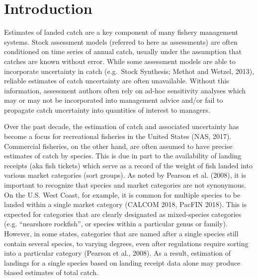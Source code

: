 \documentclass[12pt]{article}
\begin{document}
%
\clearpage
\onehalfspacing
%

%
%
\section{Introduction}\label{introduction}
%
%

Estimates of landed catch are a key component of many fishery management
systems. Stock assessment models (referred to here as assessments) are
often conditioned on time series of annual catch, usually under the
assumption that catches are known without error. While some assessment
models are able to incorporate uncertainty in catch (e.g.~Stock
Synthesis; Methot and Wetzel, 2013), reliable estimates of catch
uncertainty are often unavailable. Without this information, assessment
authors often rely on ad-hoc sensitivity analyses which may or may not
be incorporated into management advice and/or fail to propagate catch
uncertainty into quantities of interest to managers.

Over the past decade, the estimation of catch and associated uncertainty
has become a focus for recreational fisheries in the United States (NAS,
2017). Commercial fisheries, on the other hand, are often assumed to
have precise estimates of catch by species. This is due in part to the
availability of landing receipts (aka fish tickets) which serve as a
record of the weight of fish landed into various market categories (sort
groups). As noted by Pearson et al. (2008), it is important to recognize
that species and market categories are not synonymous. On the U.S. West
Coast, for example, it is common for multiple species to be landed
within a single market category (CALCOM 2018, PacFIN 2018). This is
expected for categories that are clearly designated as mixed-species
categories (e.g. ``nearshore rockfish'', or species within a particular
genus or family). However, in some states, categories that are named
after a single species still contain several species, to varying
degrees, even after regulations require sorting into a particular
category (Pearson et al., 2008). As a result, estimation of landings for
a single species based on landing receipt data alone may produce biased
estimates of total catch.
\end{document}
